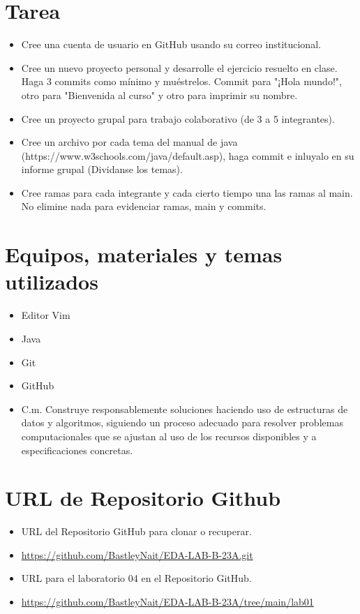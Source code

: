 \documentclass{article}
\begin{document}
	\section{Tarea}
	\begin{itemize}		
		\item Cree una cuenta de usuario en GitHub usando su correo institucional.
		\item Cree un nuevo proyecto personal y desarrolle el ejercicio resuelto en clase. Haga 3 commits como mínimo y muéstrelos. Commit para "¡Hola mundo!", otro para "Bienvenida al curso" y otro para imprimir su nombre.
		\item Cree un proyecto grupal para trabajo colaborativo (de 3 a 5 integrantes).
		\item Cree un archivo por cada tema del manual de java (https://www.w3schools.com/java/default.asp), haga commit e inluyalo en su informe grupal (Dividanse los temas).
		\item Cree ramas para cada integrante y cada cierto tiempo una las ramas al main. No elimine nada para evidenciar ramas, main y commits.

		
	\end{itemize}
		
	\section{Equipos, materiales y temas utilizados}
	\begin{itemize}
		\item Editor Vim
		\item Java
		\item Git
		\item GitHub
		\item C.m. Construye responsablemente soluciones haciendo uso de estructuras de datos y algoritmos, siguiendo un proceso adecuado para resolver problemas computacionales que se ajustan al uso de los recursos disponibles y a especificaciones concretas.
		
	\end{itemize}
	
	\section{URL de Repositorio Github}
	\begin{itemize}
		\item URL del Repositorio GitHub para clonar o recuperar.
		\item \url{https://github.com/BastleyNait/EDA-LAB-B-23A.git}
		\item URL para el laboratorio 04 en el Repositorio GitHub.
		\item \url{https://github.com/BastleyNait/EDA-LAB-B-23A/tree/main/lab01}
	\end{itemize}
	
\end{document}
